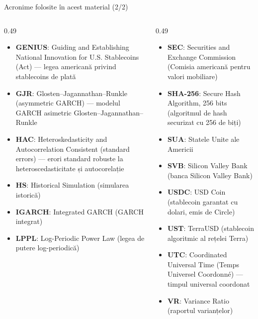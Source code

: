 \begin{frame}{Acronime folosite în acest material (2/2)}
\begin{columns}[T]
\begin{column}{0.49\textwidth}
\begin{itemize}\setlength{\itemsep}{0pt}
    \item \textbf{GENIUS}: Guiding and Establishing National Innovation for U.S. Stablecoins (Act) — legea americană privind stablecoins de plată
    \item \textbf{GJR}: Glosten–Jagannathan–Runkle (asymmetric GARCH) — modelul GARCH asimetric Glosten–Jagannathan–Runkle
    \item \textbf{HAC}: Heteroskedasticity and Autocorrelation Consistent (standard errors) — erori standard robuste la heteroscedasticitate și autocorelație
    \item \textbf{HS}: Historical Simulation (simularea istorică)
    \item \textbf{IGARCH}: Integrated GARCH (GARCH integrat)
    \item \textbf{LPPL}: Log-Periodic Power Law (legea de putere log-periodică)
\end{itemize}
\end{column}
\begin{column}{0.49\textwidth}
\begin{itemize}\setlength{\itemsep}{0pt}
    \item \textbf{SEC}: Securities and Exchange Commission (Comisia americană pentru valori mobiliare)
    \item \textbf{SHA-256}: Secure Hash Algorithm, 256 bits (algoritmul de hash securizat cu 256 de biți)
    \item \textbf{SUA}: Statele Unite ale Americii
    \item \textbf{SVB}: Silicon Valley Bank (banca Silicon Valley Bank)
    \item \textbf{USDC}: USD Coin (stablecoin garantat cu dolari, emis de Circle)
    \item \textbf{UST}: TerraUSD (stablecoin algoritmic al rețelei Terra)
    \item \textbf{UTC}: Coordinated Universal Time (Temps Universel Coordonné) — timpul universal coordonat
    \item \textbf{VR}: Variance Ratio (raportul varianțelor)
\end{itemize}
\end{column}
\end{columns}
\end{frame}

